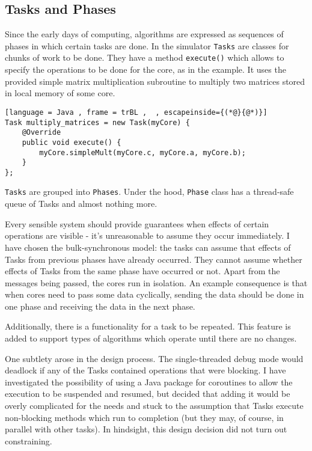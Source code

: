 \documentclass[12pt,a4paper,oneside,openright]{report}
\begin{document}
\subsection{Tasks and Phases}
Since the early days of computing, algorithms are expressed as sequences of phases in which certain tasks are done. In the simulator \texttt{Tasks} are classes for chunks of work to be done. They have a method \texttt{execute()} which allows to specify the operations to be done for the core, as in the example. It uses the provided simple matrix multiplication subroutine to multiply two matrices stored in local memory of some core. 

\begin{lstlisting}[language = Java , frame = trBL ,  , escapeinside={(*@}{@*)}]
Task multiply_matrices = new Task(myCore) {
    @Override
    public void execute() {
        myCore.simpleMult(myCore.c, myCore.a, myCore.b);
    }
};
\end{lstlisting}


\texttt{Tasks} are grouped into \texttt{Phases}. Under the hood, \texttt{Phase} class has a thread-safe queue of Tasks and almost nothing more.

Every sensible system should provide guarantees when effects of certain operations are visible - it's unreasonable to assume they occur immediately. I have chosen the bulk-synchronous model: the tasks can assume that effects of Tasks from previous phases have already occurred. They cannot assume whether effects of Tasks from the same phase have occurred or not. Apart from the messages being passed, the cores run in isolation. An example consequence is that when cores need to pass some data cyclically, sending the data should be done in one phase and receiving the data in the next phase.

Additionally, there is a functionality for a task to be repeated. This feature is added to support types of algorithms which operate until there are no changes.

One subtlety arose in the design process. The single-threaded debug mode would deadlock if any of the Tasks contained operations that were blocking. I have investigated the possibility of using a Java package for coroutines to allow the execution to be suspended and resumed, but decided that adding it would be overly complicated for the needs and stuck to the assumption that Tasks execute non-blocking methods which run to completion (but they may, of course, in parallel with other tasks). In hindsight, this design decision did not turn out constraining.
\end{document}
